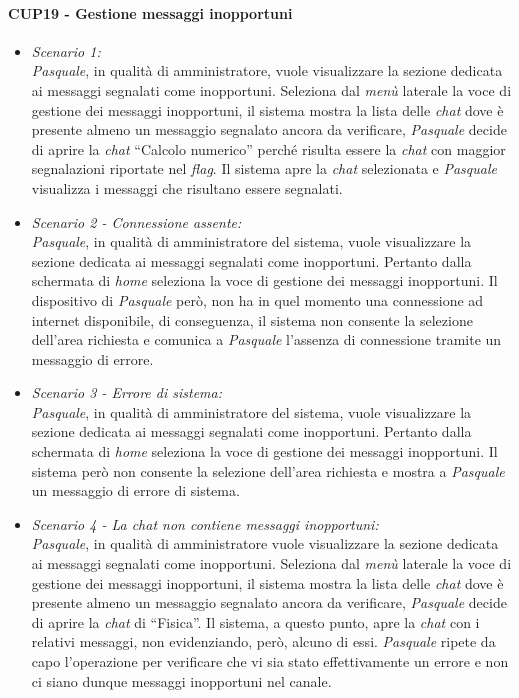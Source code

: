 \paragraph{CUP19 - Gestione messaggi inopportuni\\}
\begin{itemize}
	\item \textit{Scenario 1:\\}
	\textit{Pasquale}, in qualità di amministratore, vuole visualizzare la sezione dedicata ai messaggi segnalati come inopportuni. Seleziona dal \textit{menù} laterale la voce di gestione dei messaggi inopportuni, il sistema mostra la lista delle \textit{chat} dove è presente almeno un messaggio segnalato ancora da verificare, \textit{Pasquale} decide di aprire la \textit{chat} “Calcolo numerico” perché risulta essere la \textit{chat} con maggior segnalazioni riportate nel \textit{flag}. Il sistema apre la \textit{chat} selezionata e \textit{Pasquale} visualizza i messaggi che risultano essere segnalati.\\
	
	\item \textit{Scenario 2 - Connessione assente:\\}
	\textit{Pasquale}, in qualità di amministratore del sistema, vuole visualizzare la sezione dedicata ai messaggi segnalati come inopportuni. Pertanto dalla schermata di \textit{home} seleziona la voce di gestione dei messaggi inopportuni. Il dispositivo di \textit{Pasquale} però, non ha in quel momento una connessione ad internet disponibile, di conseguenza, il sistema non consente la selezione dell’area richiesta e comunica a \textit{Pasquale} l’assenza di connessione tramite un messaggio di errore.\\
	
	\item \textit{Scenario 3 - Errore di sistema:\\}
	\textit{Pasquale}, in qualità di amministratore del sistema, vuole visualizzare la sezione dedicata ai messaggi segnalati come inopportuni. Pertanto dalla schermata di \textit{home} seleziona la voce di gestione dei messaggi inopportuni. Il sistema però non consente la selezione dell’area richiesta e mostra a \textit{Pasquale} un messaggio di errore di sistema.\\
	
	\item \textit{Scenario 4 -  La chat non contiene messaggi inopportuni:\\}
	\textit{Pasquale}, in qualità di amministratore vuole visualizzare la sezione dedicata ai messaggi segnalati come inopportuni. Seleziona dal \textit{menù} laterale la voce di gestione dei messaggi inopportuni, il sistema mostra la lista delle \textit{chat} dove è presente almeno un messaggio segnalato ancora da verificare, \textit{Pasquale} decide di aprire la \textit{chat} di “Fisica”. Il sistema, a questo punto, apre la \textit{chat} con i relativi messaggi, non evidenziando, però, alcuno di essi. 
	\textit{Pasquale} ripete da capo l’operazione per verificare che vi sia stato effettivamente un errore e non ci siano dunque messaggi inopportuni nel canale.\\
\end{itemize}


